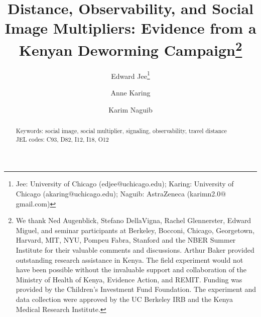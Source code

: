 \documentclass[12pt,a4paper]{article}
\author{Edward Jee\thanks{Jee: University of Chicago (edjee$@$uchicago.edu); Karing: University of Chicago (akaring$@$uchicago.edu); Naguib: AstraZeneca (karimn2.0$@$gmail.com)}
  \and
  Anne Karing 
    \and
  Karim Naguib}
\title{\Large{Distance, Observability, and Social Image Multipliers: Evidence from a Kenyan Deworming Campaign}\thanks{We thank Ned Augenblick, Stefano DellaVigna, Rachel Glennerster, Edward Miguel, and seminar participants at Berkeley, Bocconi, Chicago, Georgetown, Harvard, MIT, NYU, Pompeu Fabra, Stanford and the NBER Summer Institute for their valuable comments and discussions. Arthur Baker provided outstanding research assistance in Kenya. The field experiment would not have been possible without the invaluable support and collaboration of the Ministry of Health of Kenya, Evidence Action, and REMIT. Funding was provided by the Children's Investment Fund Foundation. The experiment and data collection were approved by the UC Berkeley IRB and the Kenya Medical Research Institute.} }
\begin{document}
  \maketitle


  \begin{abstract}

\noindent Keywords: social image, social multiplier, signaling, observability, travel distance\\
\noindent JEL codes: C93, D82, I12, I18, O12

\end{abstract}






\clearpage
\onehalfspacing
\end{document}
